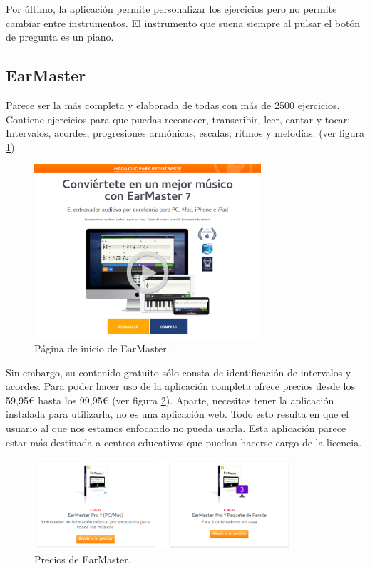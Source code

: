 \documentclass[12pt,twoside,titlepage]{report}
\begin{document}
Por último, la aplicación permite personalizar los ejercicios pero no permite cambiar entre instrumentos. El instrumento que suena siempre al pulsar el botón de pregunta es un piano.
\cite{tonedear2}

\subsection{EarMaster}
\label{sec:EarMaster}

Parece ser la más completa y elaborada de todas con más de 2500 ejercicios. Contiene ejercicios para que puedas reconocer, transcribir, leer, cantar y tocar: Intervalos, acordes, progresiones armónicas, escalas, ritmos y melodías.
(ver figura \ref{fig:earmaster})
\cite{earmaster1}

\begin{figure}[H] 
    \includegraphics[width=0.75\textwidth]{Estado del Arte/earmaster}
    \centering
    \caption{Página de inicio de EarMaster.}
    \label{fig:earmaster}
\end{figure}

Sin embargo, su contenido gratuito sólo consta de identificación de intervalos y acordes. Para poder hacer uso de la aplicación completa ofrece precios desde los 59,95€ hasta los 99,95€ (ver figura \ref{fig:earmasterprices}). Aparte, necesitas tener la aplicación instalada para utilizarla, no es una aplicación web. Todo esto resulta en que el usuario al que nos estamos enfocando no pueda usarla. Esta aplicación parece estar más destinada a centros educativos que puedan hacerse cargo de la licencia.
\cite{earmaster2}

\begin{figure}[H] 
    \includegraphics[width=0.85\textwidth]{Estado del Arte/earmasterprices}
    \centering
    \caption{Precios de EarMaster.}
    \label{fig:earmasterprices}
\end{figure}
\end{document}
